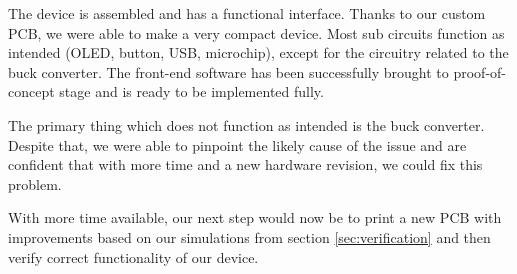 The device is  assembled and has a functional interface. Thanks  to our custom
PCB, we were able to make a very compact device. Most sub circuits function as
intended (OLED, button,  USB, microchip), except for the  circuitry related to
the buck converter.   The front-end software has been  successfully brought to
proof-of-concept stage and is ready to be implemented fully.

The  primary  thing   which  does  not  function  as  intended   is  the  buck
converter. Despite that,  we were  able to  pinpoint the  likely cause  of the
issue and are  confident that with more  time and a new  hardware revision, we
could fix this problem.

With more time available,  our next step would now be to print  a new PCB with
improvements based on our  simulations from section \ref{sec:verification} and
then verify correct functionality of our device.
